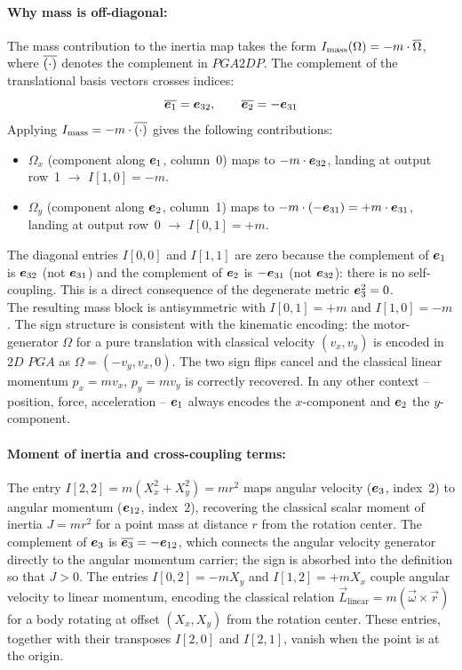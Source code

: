 \paragraph{Why mass is off-diagonal:} The mass contribution to the inertia map takes the
form
$I_\mathrm{mass}(\Omega) = -m \cdot \overline{\Omega}$, where $\overline{(\cdot)}$ denotes the
complement in $PGA2DP$. The complement of the translational basis vectors crosses indices:
\begin{equation}
    \overline{\bm{e}_{1}} = \bm{e}_{32}, \qquad \overline{\bm{e}_{2}} = -\bm{e}_{31}
    \label{eq:dual_pga2dp}
\end{equation}
Applying $I_\mathrm{mass} = -m \cdot \overline{(\cdot)}$ gives the following contributions:
\begin{itemize}
    \item $\Omega_x$ (component along $\bm{e}_{1}$, column~0) maps to $-m \cdot \bm{e}_{32}$,
    landing at output row~1 $\rightarrow$ $I[1,0] = -m$.
    \item $\Omega_y$ (component along $\bm{e}_{2}$, column~1) maps to $-m \cdot (-\bm{e}_{31})
    = +m \cdot \bm{e}_{31}$, landing at output row~0 $\rightarrow$ $I[0,1] = +m$.
\end{itemize}
The diagonal entries $I[0,0]$ and $I[1,1]$ are zero because the complement of $\bm{e}_{1}$ is
$\bm{e}_{32}$ (not $\bm{e}_{31}$) and the complement of $\bm{e}_{2}$ is $-\bm{e}_{31}$ (not $\bm{e}_{32}$):
there is no self-coupling. This is a direct consequence of the degenerate metric $\bm{e}_{3}^2
= 0$. \\

The resulting mass block is antisymmetric with $I[0,1] = +m$ and $I[1,0] = -m$. The sign
structure is consistent with the kinematic encoding: the motor-generator $\Omega$ for a
pure translation with classical velocity $(v_x, v_y)$ is encoded in $2D$ $PGA$ as $\Omega
= (-v_y, v_x, 0)$. The two sign flips cancel and the classical linear momentum $p_x =
mv_x$, $p_y = mv_y$ is correctly recovered. In any other context -- position, force,
acceleration -- $\bm{e}_{1}$ always encodes the $x$-component and $\bm{e}_{2}$ the $y$-component.

\paragraph{Moment of inertia and cross-coupling terms:} The entry $I[2,2] = m(X_x^2 +
X_y^2) =
mr^2$ maps angular velocity ($\bm{e}_{3}$, index~2) to angular momentum ($\bm{e}_{12}$, index~2),
recovering the classical scalar moment of inertia $J = mr^2$ for a point mass at distance
$r$ from the rotation center. The complement of $\bm{e}_{3}$ is $\overline{\bm{e}_{3}} = -\bm{e}_{12}$,
which connects the angular velocity generator directly to the angular momentum carrier;
the sign is absorbed into the definition so that $J > 0$. The entries $I[0,2] = -mX_y$ and
$I[1,2] = +mX_x$ couple angular velocity to linear momentum, encoding the classical
relation $\vec{L}_\mathrm{linear} = m(\vec{\omega} \times \vec{r})$ for a body rotating at
offset $(X_x, X_y)$ from the rotation center. These entries, together with their
transposes $I[2,0]$ and $I[2,1]$, vanish when the point is at the origin.

